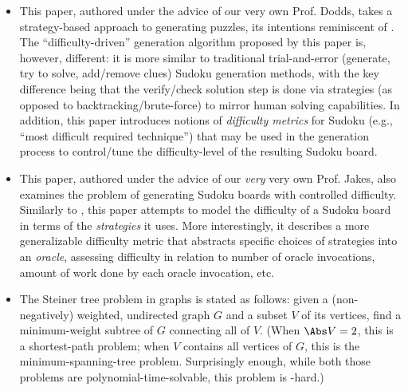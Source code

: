 \begin{itemize}
  \item {}

    \begin{annotation}
      This paper, authored under the advice of our very own Prof. Dodds, takes
      a strategy-based approach to generating puzzles, its intentions
      reminiscent of \textcite{strategy-solvable-sudoku}.  The
      ``difficulty-driven'' generation algorithm proposed by this paper is,
      however, different: it is more similar to traditional trial-and-error
      (generate, try to solve, add/remove clues) Sudoku generation methods,
      with the key difference being that the verify/check solution step is done
      via strategies (as opposed to backtracking/brute-force) to mirror human
      solving capabilities.  In addition, this paper introduces notions of
      \emph{difficulty metrics} for Sudoku (e.g., ``most difficult required
      technique'') that may be used in the generation process to control/tune
      the difficulty-level of the resulting Sudoku board.
    \end{annotation}

  \item {}

    \begin{annotation}
      This paper, authored under the advice of our \emph{very} very own Prof.
      Jakes, also examines the problem of generating Sudoku boards with
      controlled difficulty.  Similarly to \textcite{difficulty-driven-sudoku},
      this paper attempts to model the difficulty of a Sudoku board in terms of
      the \emph{strategies} it uses.  More interestingly, it describes a more
      generalizable difficulty metric that abstracts specific choices of
      strategies into an \emph{oracle}, assessing difficulty in relation to
      number of oracle invocations, amount of work done by each oracle
      invocation, etc.
    \end{annotation}

  \item {}

    \begin{annotation}
      The Steiner tree problem in graphs is stated as follows: given a
      (non-negatively) weighted, undirected graph \(G\) and a subset \(V\) of
      its vertices, find a minimum-weight subtree of \(G\) connecting all of
      \(V\). (When \(\Abs V = 2\), this is a shortest-path problem; when \(V\)
      contains all vertices of \(G\), this is the minimum-spanning-tree
      problem. Surprisingly enough, while both those problems are
      polynomial-time-solvable, this problem is \NP-hard.)


\end{annotation}
\end{itemize}
